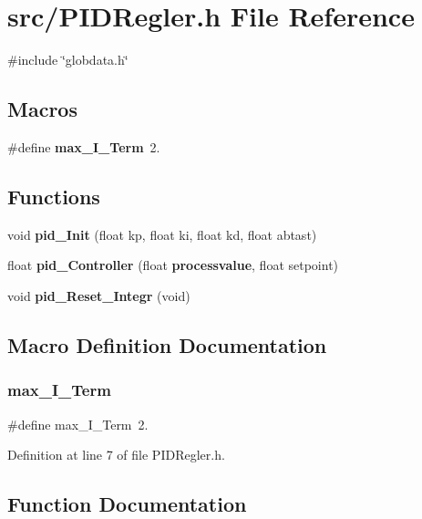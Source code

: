 \section{src/\+P\+I\+D\+Regler.h File Reference}
\label{_p_i_d_regler_8h}
{\ttfamily \#include \char`\"{}globdata.\+h\char`\"{}}\newline
\subsection*{Macros}
\begin{DoxyCompactItemize}
\item 
\#define \textbf{ max\+\_\+\+I\+\_\+\+Term}~2.
\end{DoxyCompactItemize}
\subsection*{Functions}
\begin{DoxyCompactItemize}
\item 
void \textbf{ pid\+\_\+\+Init} (float kp, float ki, float kd, float abtast)
\item 
float \textbf{ pid\+\_\+\+Controller} (float \textbf{ processvalue}, float setpoint)
\item 
void \textbf{ pid\+\_\+\+Reset\+\_\+\+Integr} (void)
\end{DoxyCompactItemize}


\subsection{Macro Definition Documentation}
\mbox{\label{_p_i_d_regler_8h_ae79139c1125154b05886caa05c9d5ba0}} 
\subsubsection{max\+\_\+\+I\+\_\+\+Term}
{\footnotesize\ttfamily \#define max\+\_\+\+I\+\_\+\+Term~2.}



Definition at line 7 of file P\+I\+D\+Regler.\+h.



\subsection{Function Documentation}
\mbox{\label{_p_i_d_regler_8h_a571e5f6885c48c0fd37fdb2d41b2d2fb}} 
